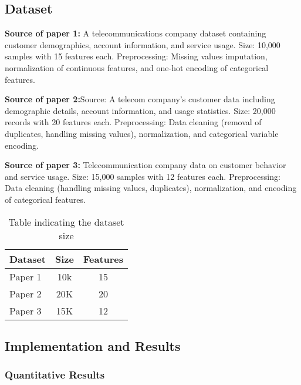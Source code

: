 \subsection{Dataset}
\textbf{Source of paper 1:} A telecommunications company dataset containing customer demographics, account information, and service usage.
Size: 10,000 samples with 15 features each.
Preprocessing: Missing values imputation, normalization of continuous features, and one-hot encoding of categorical features.

\textbf{Source of paper 2:}Source: A telecom company’s customer data including demographic details, account information, and usage statistics.
Size: 20,000 records with 20 features each.
Preprocessing: Data cleaning (removal of duplicates, handling missing values), normalization, and categorical variable encoding.

\textbf{Source of paper 3:} Telecommunication company data on customer behavior and service usage.
Size: 15,000 samples with 12 features each.
Preprocessing: Data cleaning (handling missing values, duplicates), normalization, and encoding of categorical features.

\begin{table}[htbp]
    \centering
    \caption{Table indicating the dataset size}
    \label{tab:dataset}
    \begin{tabular}{|l|c|c|}
    \hline
    \textbf{Dataset} & \textbf{Size} & \textbf{Features} \\ \hline
    Paper 1 & 10k & 15 \\ \hline
    Paper 2 & 20K & 20 \\ \hline
    Paper 3 & 15K & 12 \\ \hline
    \end{tabular}

\end{table}
\newpage
\subsection{Implementation and Results}

\subsubsection{Quantitative Results}

